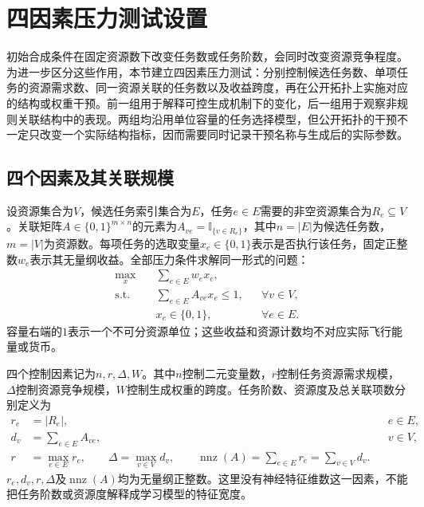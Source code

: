 \section{四因素压力测试设置}
\label{sec:03_06}

初始合成条件在固定资源数下改变任务数或任务阶数，会同时改变资源竞争程度。为进一步区分这些作用，本节建立四因素压力测试：分别控制候选任务数、单项任务的资源需求数、同一资源关联的任务数以及收益跨度，再在公开拓扑上实施对应的结构或权重干预。前一组用于解释可控生成机制下的变化，后一组用于观察非规则关联结构中的表现。两组均沿用单位容量的任务选择模型，但公开拓扑的干预不一定只改变一个实际结构指标，因而需要同时记录干预名称与生成后的实际参数。

\subsection{四个因素及其关联规模}

设资源集合为$V$，候选任务索引集合为$E$，任务$e\in E$需要的非空资源集合为$R_e\subseteq V$。关联矩阵$A\in\{0,1\}^{m\times n}$的元素为$A_{ve}=\mathbb{I}_{\{v\in R_e\}}$，其中$n=|E|$为候选任务数，$m=|V|$为资源数。每项任务的选取变量$x_e\in\{0,1\}$表示是否执行该任务，固定正整数$w_e$表示其无量纲收益。全部压力条件求解同一形式的问题：
\begin{equation}
 \begin{aligned}
 \max_x\quad &\sum_{e\in E}w_ex_e,\\
 \text{s.t.}\quad &\sum_{e\in E}A_{ve}x_e\leq1,
 &&\forall v\in V,\\
 &x_e\in\{0,1\},&&\forall e\in E.
 \end{aligned}
 \label{s0306:model}
\end{equation}
容量右端的$1$表示一个不可分资源单位；这些收益和资源计数均不对应实际飞行能量或货币。

四个控制因素记为$n,r,\Delta,W$。其中$n$控制二元变量数，$r$控制任务资源需求规模，$\Delta$控制资源竞争规模，$W$控制生成权重的跨度。任务阶数、资源度及总关联项数分别定义为
\begin{align}
 r_e&=|R_e|,&&e\in E,\label{s0306:edge_rank}\\
 d_v&=\sum_{e\in E}A_{ve},&&v\in V,\label{s0306:resource_degree}\\
 r&=\max_{e\in E}r_e,\qquad
 \Delta=\max_{v\in V}d_v,\qquad
 \operatorname{nnz}(A)=\sum_{e\in E}r_e=\sum_{v\in V}d_v.
 \label{s0306:incidence_count}
\end{align}
$r_e,d_v,r,\Delta$及$\operatorname{nnz}(A)$均为无量纲正整数。这里没有神经特征维数这一因素，不能把任务阶数或资源度解释成学习模型的特征宽度。

